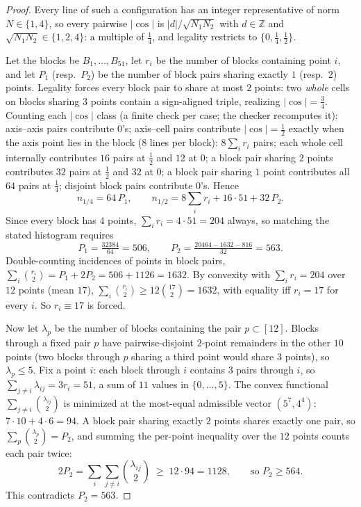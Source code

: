\documentclass[11pt]{article}
\theoremstyle{remark}
\newcommand{\ZZ}{\mathbb{Z}}
\begin{document}
\begin{proof}
Every line of such a configuration has an integer representative of norm
$N\in\{1,4\}$, so every pairwise $|\cos|$ is $|d|/\sqrt{N_1N_2}$ with
$d\in\ZZ$ and $\sqrt{N_1N_2}\in\{1,2,4\}$: a multiple of $\tfrac14$, and
legality restricts to $\{0,\tfrac14,\tfrac12\}$.

Let the blocks be $B_1,\dots,B_{51}$, let $r_i$ be the number of blocks
containing point $i$, and let $P_1$ (resp.\ $P_2$) be the number of block
pairs sharing exactly $1$ (resp.\ $2$) points. Legality forces every block
pair to share at most $2$ points: two \emph{whole} cells on blocks sharing
$3$ points contain a sign-aligned triple, realizing $|\cos|=\tfrac34$.
Counting each $|\cos|$ class (a finite check per case; the checker
recomputes it):
axis--axis pairs contribute $0$'s; axis--cell pairs contribute
$|\cos|=\tfrac12$ exactly when the axis point lies in the block ($8$ lines
per block): $8\sum_i r_i$ pairs; each whole cell internally contributes
$16$ pairs at $\tfrac12$ and $12$ at $0$; a block pair sharing $2$ points
contributes $32$ pairs at $\tfrac12$ and $32$ at $0$; a block pair sharing
$1$ point contributes all $64$ pairs at $\tfrac14$; disjoint block pairs
contribute $0$'s. Hence
\[
n_{1/4}=64\,P_1,
\qquad
n_{1/2}=8\sum_i r_i+16\cdot 51+32\,P_2 .
\]
Since every block has $4$ points, $\sum_i r_i=4\cdot51=204$ always, so
matching the stated histogram requires
\[
P_1=\tfrac{32384}{64}=506,
\qquad
P_2=\tfrac{20464-1632-816}{32}=563 .
\]
Double-counting incidences of points in block pairs,
$\sum_i\binom{r_i}{2}=P_1+2P_2=506+1126=1632$. By convexity with
$\sum_i r_i=204$ over $12$ points (mean $17$),
$\sum_i\binom{r_i}{2}\ge 12\binom{17}{2}=1632$, with equality iff
$r_i=17$ for every $i$. So $r_i\equiv 17$ is forced.

Now let $\lambda_p$ be the number of blocks containing the pair
$p\subset[12]$. Blocks through a fixed pair $p$ have pairwise-disjoint
$2$-point remainders in the other $10$ points (two blocks through $p$
sharing a third point would share $3$ points), so $\lambda_p\le 5$. Fix a
point $i$: each block through $i$ contains $3$ pairs through $i$, so
$\sum_{j\ne i}\lambda_{ij}=3r_i=51$, a sum of $11$ values in
$\{0,\dots,5\}$. The convex functional $\sum_{j\ne i}\binom{\lambda_{ij}}2$
is minimized at the most-equal admissible vector $(5^7,4^4)$:
$7\cdot10+4\cdot6=94$. A block pair sharing exactly $2$ points shares
exactly one pair, so $\sum_p\binom{\lambda_p}2=P_2$, and summing the
per-point inequality over the $12$ points counts each pair twice:
\[
2P_2=\sum_i\sum_{j\ne i}\binom{\lambda_{ij}}2\;\ge\;12\cdot 94=1128,
\qquad\text{so } P_2\ge 564 .
\]
This contradicts $P_2=563$.
\end{proof}
\end{document}
